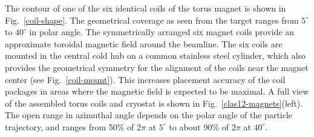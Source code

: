 \documentclass[final,3p,twocolumn]{elsarticle}
\begin{document}
The contour of one of the six identical coils of the torus magnet is shown in Fig.~\ref{coil-shape}. The geometrical
coverage as seen from the target ranges from $5^\circ$ to $40^\circ$ in polar angle. The symmetrically arranged six
magnet coils provide an approximate toroidal magnetic field around the beamline. The six coils are mounted in the
central cold hub on a common stainless steel cylinder, which also provides the geometrical symmetry for the alignment
of the coils near the magnet center (see Fig.~\ref{coil-mount}). This increases placement accuracy of the coil
packages in areas where the magnetic field is expected to be maximal. A full view of the assembled torus coils and
cryostat is shown in Fig.~\ref{clas12-magnets}(left). The open range in azimuthal angle depends on the polar angle
of the particle trajectory, and ranges from 50\% of $2\pi$ at $5^\circ$ to about 90\% of $2\pi$ at $40^\circ$.
\end{document}
